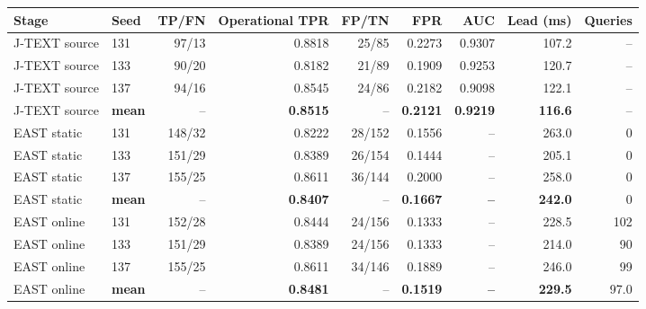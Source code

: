 \begin{tabular}{llrrrrrrr}
\toprule
Stage & Seed & TP/FN & Operational TPR & FP/TN & FPR & AUC & Lead (ms) & Queries \\
\midrule
J-TEXT source & 131 & 97/13 & 0.8818 & 25/85 & 0.2273 & 0.9307 & 107.2 & -- \\
J-TEXT source & 133 & 90/20 & 0.8182 & 21/89 & 0.1909 & 0.9253 & 120.7 & -- \\
J-TEXT source & 137 & 94/16 & 0.8545 & 24/86 & 0.2182 & 0.9098 & 122.1 & -- \\
J-TEXT source & \textbf{mean} & -- & \textbf{0.8515} & -- & \textbf{0.2121} & \textbf{0.9219} & \textbf{116.6} & -- \\
\midrule
EAST static & 131 & 148/32 & 0.8222 & 28/152 & 0.1556 & -- & 263.0 & 0 \\
EAST static & 133 & 151/29 & 0.8389 & 26/154 & 0.1444 & -- & 205.1 & 0 \\
EAST static & 137 & 155/25 & 0.8611 & 36/144 & 0.2000 & -- & 258.0 & 0 \\
EAST static & \textbf{mean} & -- & \textbf{0.8407} & -- & \textbf{0.1667} & \textbf{--} & \textbf{242.0} & 0 \\
\midrule
EAST online & 131 & 152/28 & 0.8444 & 24/156 & 0.1333 & -- & 228.5 & 102 \\
EAST online & 133 & 151/29 & 0.8389 & 24/156 & 0.1333 & -- & 214.0 & 90 \\
EAST online & 137 & 155/25 & 0.8611 & 34/146 & 0.1889 & -- & 246.0 & 99 \\
EAST online & \textbf{mean} & -- & \textbf{0.8481} & -- & \textbf{0.1519} & \textbf{--} & \textbf{229.5} & 97.0 \\
\bottomrule
\end{tabular}
